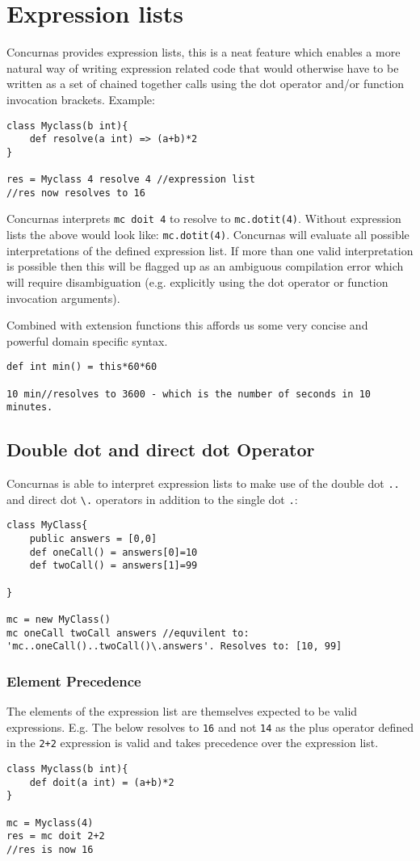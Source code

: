 \documentclass[conc-doc]{subfiles}
\begin{document}
	
	\chapter[Expression lists]{Expression lists}
	\label{ch:exprLists}

Concurnas provides expression lists, this is a neat feature which enables a more natural way of writing expression related code that would otherwise have to be written as a set of chained together calls using the dot operator and/or function invocation brackets. Example:
\begin{lstlisting}
class Myclass(b int){
	def resolve(a int) => (a+b)*2
}

res = Myclass 4 resolve 4 //expression list
//res now resolves to 16
\end{lstlisting}

Concurnas interprets \lstinline{mc doit 4} to resolve to \lstinline{mc.dotit(4)}. Without expression lists the above would look like: \lstinline{mc.dotit(4)}. Concurnas will evaluate all possible interpretations of the defined expression list. If more than one valid interpretation is possible then this will be flagged up as an ambiguous compilation error which will require disambiguation (e.g. explicitly using the dot operator or function invocation arguments).

Combined with extension functions this affords us some very concise and powerful domain specific syntax.
\begin{lstlisting}
def int min() = this*60*60

10 min//resolves to 3600 - which is the number of seconds in 10 minutes.
\end{lstlisting}

\section{Double dot and direct dot Operator}
Concurnas is able to interpret expression lists to make use of the double dot \lstinline{..} and direct dot \lstinline{\.} operators in addition to the single dot \lstinline{.}:
\begin{lstlisting}
class MyClass{
	public answers = [0,0]
	def oneCall() = answers[0]=10
	def twoCall() = answers[1]=99
	
}

mc = new MyClass()
mc oneCall twoCall answers //equvilent to: 'mc..oneCall()..twoCall()\.answers'. Resolves to: [10, 99]
\end{lstlisting}

\subsection{Element Precedence}
The elements of the expression list are themselves expected to be valid expressions. E.g. The below resolves to \lstinline{16} and not \lstinline{14} as the plus operator defined in the \lstinline{2+2} expression is valid and takes precedence over the expression list.
\begin{lstlisting}
class Myclass(b int){
	def doit(a int) = (a+b)*2
}

mc = Myclass(4)
res = mc doit 2+2
//res is now 16
\end{lstlisting}
\end{document}
